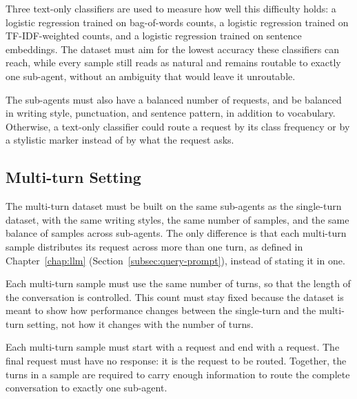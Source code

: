 Three text-only classifiers are used to measure how well this difficulty holds: a logistic regression trained on bag-of-words counts, a logistic regression trained on TF-IDF-weighted counts, and a logistic regression trained on sentence embeddings. The dataset must aim for the lowest accuracy these classifiers can reach, while every sample still reads as natural and remains routable to exactly one sub-agent, without an ambiguity that would leave it unroutable.

The sub-agents must also have a balanced number of requests, and be balanced in writing style, punctuation, and sentence pattern, in addition to vocabulary. Otherwise, a text-only classifier could route a request by its class frequency or by a stylistic marker instead of by what the request asks.

\subsection{Multi-turn Setting}
\label{subsec:multiturn-setting}

The multi-turn dataset must be built on the same sub-agents as the single-turn dataset, with the same writing styles, the same number of samples, and the same balance of samples across sub-agents. The only difference is that each multi-turn sample distributes its request across more than one turn, as defined in Chapter~\ref{chap:llm} (Section~\ref{subsec:query-prompt}), instead of stating it in one.

Each multi-turn sample must use the same number of turns, so that the length of the conversation is controlled. This count must stay fixed because the dataset is meant to show how performance changes between the single-turn and the multi-turn setting, not how it changes with the number of turns.

Each multi-turn sample must start with a request and end with a request. The final request must have no response: it is the request to be routed. Together, the turns in a sample are required to carry enough information to route the complete conversation to exactly one sub-agent.
